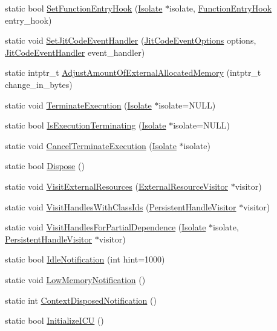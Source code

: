 \begin{DoxyCompactItemize}
\item 
static bool \hyperlink{classv8_1_1_v8_a156ba8ae8d0e4112725ad2dd410e280d}{Set\+Function\+Entry\+Hook} (\hyperlink{classv8_1_1_isolate}{Isolate} $\ast$isolate, \hyperlink{namespacev8_aaf07fb6bb13f295da3c6568938b7dec5}{Function\+Entry\+Hook} entry\+\_\+hook)
\item 
static void \hyperlink{classv8_1_1_v8_abf1b71bf2e3cb73fa44c6939bd70ab5e}{Set\+Jit\+Code\+Event\+Handler} (\hyperlink{namespacev8_a06f34fa4fa4cfc8518366808d1d461c1}{Jit\+Code\+Event\+Options} options, \hyperlink{namespacev8_a39243bc91e63d64d111452fdb98c4733}{Jit\+Code\+Event\+Handler} event\+\_\+handler)
\item 
static intptr\+\_\+t \hyperlink{classv8_1_1_v8_ab9532c940926018bc1e88ed21662395f}{Adjust\+Amount\+Of\+External\+Allocated\+Memory} (intptr\+\_\+t change\+\_\+in\+\_\+bytes)
\item 
static void \hyperlink{classv8_1_1_v8_a81a47f6709c7d376a448d6315398aeb8}{Terminate\+Execution} (\hyperlink{classv8_1_1_isolate}{Isolate} $\ast$isolate=N\+U\+L\+L)
\item 
static bool \hyperlink{classv8_1_1_v8_a8e0ad59109f022ecca7121e2ea990997}{Is\+Execution\+Terminating} (\hyperlink{classv8_1_1_isolate}{Isolate} $\ast$isolate=N\+U\+L\+L)
\item 
static void \hyperlink{classv8_1_1_v8_ac2fb064870a2ca3bf6f7933c3dff6d85}{Cancel\+Terminate\+Execution} (\hyperlink{classv8_1_1_isolate}{Isolate} $\ast$isolate)
\item 
static bool \hyperlink{classv8_1_1_v8_a566450d632c0a63770682b9da3cae08d}{Dispose} ()
\item 
static void \hyperlink{classv8_1_1_v8_a1fd57739642c8304dc8a34dd283da840}{Visit\+External\+Resources} (\hyperlink{classv8_1_1_external_resource_visitor}{External\+Resource\+Visitor} $\ast$visitor)
\item 
static void \hyperlink{classv8_1_1_v8_a5bf6f26e51cd3e9d71a662fe7efa5206}{Visit\+Handles\+With\+Class\+Ids} (\hyperlink{classv8_1_1_persistent_handle_visitor}{Persistent\+Handle\+Visitor} $\ast$visitor)
\item 
static void \hyperlink{classv8_1_1_v8_ab2e242c45c73a0cee755e55acec71bd5}{Visit\+Handles\+For\+Partial\+Dependence} (\hyperlink{classv8_1_1_isolate}{Isolate} $\ast$isolate, \hyperlink{classv8_1_1_persistent_handle_visitor}{Persistent\+Handle\+Visitor} $\ast$visitor)
\item 
static bool \hyperlink{classv8_1_1_v8_abcafb07ace99c980e42662299eb9eb1d}{Idle\+Notification} (int hint=1000)
\item 
static void \hyperlink{classv8_1_1_v8_a7df118b9667d04903f8e9fb7452fd1ac}{Low\+Memory\+Notification} ()
\item 
static int \hyperlink{classv8_1_1_v8_a06126bd2345c086a376f934ec1fbcce6}{Context\+Disposed\+Notification} ()
\item 
static bool \hyperlink{classv8_1_1_v8_a706d353d5991c981d3c83e617a252043}{Initialize\+I\+C\+U} ()
\end{DoxyCompactItemize}
